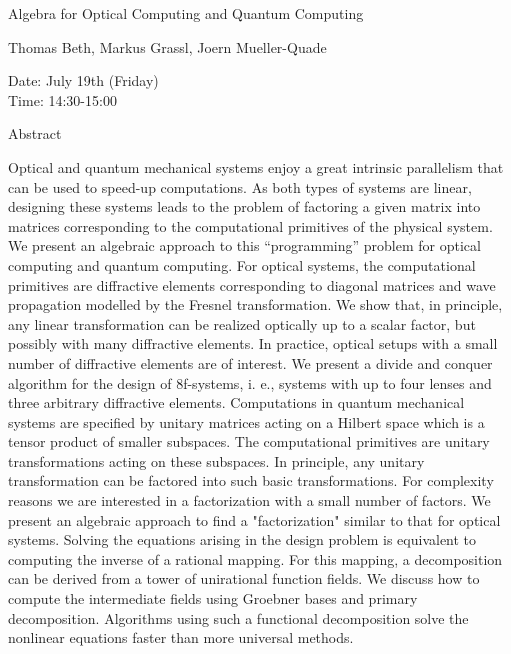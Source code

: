 \begin{center}
\LARGE
Algebra for Optical Computing and Quantum Computing
\end{center}

\begin{center}
\Large
Thomas Beth, Markus Grassl, Joern Mueller-Quade

\end{center}

\noindent
Date:  July 19th (Friday)\\
Time: 14:30-15:00\\

\begin{center}
\large
Abstract
\end{center}

Optical and quantum mechanical systems enjoy a great intrinsic parallelism that can be used to
speed-up computations. As both types of systems are linear, designing these systems leads to the
problem of factoring a given matrix into matrices corresponding to the computational primitives
of the physical system. 
We present an algebraic approach to this ``programming'' problem for optical computing and
quantum computing. 
For optical systems, the computational primitives are diffractive elements corresponding to
diagonal matrices and wave propagation modelled by the Fresnel transformation. We show that, in
principle, any linear transformation can be realized optically up to a scalar factor, but possibly
with many diffractive elements. In practice, optical setups with a small number of diffractive
elements are of interest. We present a divide and conquer algorithm for the design of 8f-systems,
i. e., systems with up to four lenses and three arbitrary diffractive elements. 
Computations in quantum mechanical systems are specified by unitary matrices acting on a Hilbert
space which is a tensor product of smaller subspaces. The computational primitives are unitary
transformations acting on these subspaces. In principle, any unitary transformation can be factored
into such basic transformations. For complexity reasons we are interested in a factorization with a
small number of factors. We present an algebraic approach to find a "factorization" similar to that
for optical systems. 
Solving the equations arising in the design problem is equivalent to computing the inverse of a
rational mapping. For this mapping, a decomposition can be derived from a tower of unirational
function fields. We discuss how to compute the intermediate fields using Groebner bases and
primary decomposition. Algorithms using such a functional decomposition solve the nonlinear
equations faster than more universal methods. 

